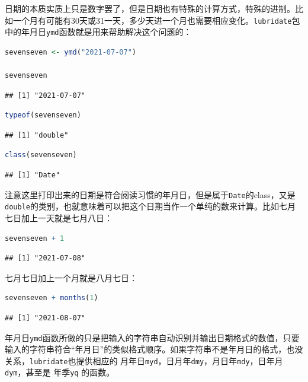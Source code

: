 \documentclass[]{ctexbook}
\newcommand{\passthrough}[1]{#1}
\begin{document}
日期的本质实质上只是数字罢了，但是日期也有特殊的计算方式，特殊的进制。比如一个月有可能有30天或31一天，多少天进一个月也需要相应变化。\passthrough{\lstinline!lubridate!}包中的年月日\passthrough{\lstinline!ymd!}函数就是用来帮助解决这个问题的：

\begin{lstlisting}[language=R]
sevenseven <- ymd("2021-07-07") 

sevenseven
\end{lstlisting}

\begin{lstlisting}
## [1] "2021-07-07"
\end{lstlisting}

\begin{lstlisting}[language=R]
typeof(sevenseven)
\end{lstlisting}

\begin{lstlisting}
## [1] "double"
\end{lstlisting}

\begin{lstlisting}[language=R]
class(sevenseven)
\end{lstlisting}

\begin{lstlisting}
## [1] "Date"
\end{lstlisting}

注意这里打印出来的日期是符合阅读习惯的年月日，但是属于\passthrough{\lstinline!Date!}的class，又是\passthrough{\lstinline!double!}的类别，也就意味着可以把这个日期当作一个单纯的数来计算。比如七月七日加上一天就是七月八日：

\begin{lstlisting}[language=R]
sevenseven + 1
\end{lstlisting}

\begin{lstlisting}
## [1] "2021-07-08"
\end{lstlisting}

七月七日加上一个月就是八月七日：

\begin{lstlisting}[language=R]
sevenseven + months(1)
\end{lstlisting}

\begin{lstlisting}
## [1] "2021-08-07"
\end{lstlisting}

年月日\passthrough{\lstinline!ymd!}函数所做的只是把输入的字符串自动识别并输出日期格式的数值，只要输入的字符串符合``年月日''的类似格式顺序。如果字符串不是年月日的格式，也没关系，\passthrough{\lstinline!lubridate!}也提供相应的 月年日\passthrough{\lstinline!myd!}，日月年\passthrough{\lstinline!dmy!}，月日年\passthrough{\lstinline!mdy!}，日年月\passthrough{\lstinline!dym!}，甚至是 年季\passthrough{\lstinline!yq!} 的函数。
\end{document}
